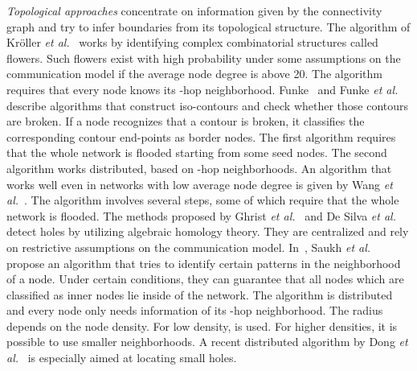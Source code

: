 \documentclass{llncs}
\begin{document}
\emph{Topological approaches} concentrate on information given by the connectivity graph and try to infer boundaries from its topological structure.
The algorithm of Kr\"oller \emph{et al.}~\cite{kfpf-dbrte-06} works by identifying complex combinatorial structures called flowers.
Such flowers exist with high probability under some assumptions on the communication model if the average node degree is above 20.
The algorithm requires that every node knows its -hop neighborhood.
Funke~\cite{f05} and Funke \emph{et al.}~\cite{fk06} describe algorithms that construct iso-contours and check whether those contours are broken.
If a node recognizes that a contour is broken, it classifies the corresponding contour end-points as border nodes.
The first algorithm requires that the whole network is flooded starting from some seed nodes.
The second algorithm works distributed, based on -hop neighborhoods.
An algorithm that works well even in networks with low average node degree is given by Wang \emph{et al.}~\cite{wgm06}.
The algorithm involves several steps, some of which require that the whole network is flooded.
The methods proposed by Ghrist \emph{et al.}~\cite{ghrist05} and De Silva \emph{et al.}~\cite{ghrist06} detect holes by utilizing algebraic homology theory.
They are centralized and rely on restrictive assumptions on the communication model.
In~\cite{saukh08,saukh10}, Saukh \emph{et al.} propose an algorithm that tries to identify certain patterns in the neighborhood of a node.
Under certain conditions, they can guarantee that all nodes which are classified as inner nodes lie inside of the network.
The algorithm is distributed and every node only needs information of its -hop neighborhood.
The radius  depends on the node density. For low density,  is used. For higher densities, it is possible to use
smaller neighborhoods.
A recent distributed algorithm by Dong \emph{et al.}~\cite{dll09} is especially aimed at locating small holes.
\end{document}
